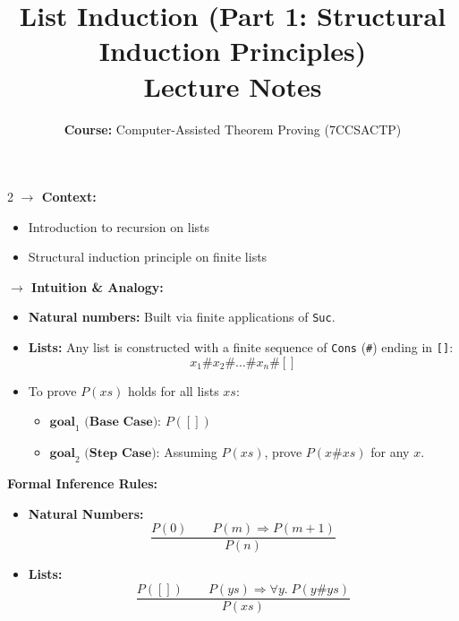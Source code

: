 \documentclass[10pt,a4paper]{article}
\title{\textbf{\huge List Induction (Part 1: Structural Induction Principles)}\\[0.3em]
\large Lecture Notes}
\author{\textbf{Course:} Computer-Assisted Theorem Proving (7CCSACTP)}
\date{}
\begin{document}
\maketitle
\vspace{-1.5em}

\begin{tcolorbox}[title=1. Induction on Lists (Structural Induction)]
\begin{multicols}{2}
\textbf{$\rightarrow$ Context:}
\begin{itemize}[leftmargin=1.2em, itemsep=2pt]
    \item Introduction to recursion on lists
    \item Structural induction principle on finite lists
\end{itemize}

\textbf{$\rightarrow$ Intuition \& Analogy:}
\begin{itemize}[leftmargin=1.2em, itemsep=2pt]
    \item \textbf{Natural numbers:} Built via finite applications of \texttt{Suc}.
    \item \textbf{Lists:} Any list is constructed with a finite sequence of \texttt{Cons} (\texttt{\#}) ending in \texttt{[]}:
    \[ x_1 \# x_2 \# \dots \# x_n \# [] \]
    \item To prove $P(xs)$ holds for all lists $xs$:
    \begin{itemize}[leftmargin=1em, label=$\bullet$]
        \item $\textbf{goal}_1 \textbf{ (Base Case):}$ $P([])$
        \item $\textbf{goal}_2 \textbf{ (Step Case):}$ Assuming $P(xs)$, prove $P(x \# xs)$ for any $x$.
    \end{itemize}
\end{itemize}

\columnbreak

\textbf{Formal Inference Rules:}
\begin{itemize}[leftmargin=1.2em, itemsep=4pt]
    \item \textbf{Natural Numbers:}
    \[ \frac{P(0) \qquad P(m) \Longrightarrow P(m+1)}{P(n)} \]
    
    \item \textbf{Lists:}
    \[ \frac{P([]) \qquad P(ys) \Longrightarrow \forall y.\; P(y \# ys)}{P(xs)} \]
\end{itemize}
\end{multicols}
\end{tcolorbox}
\end{document}
